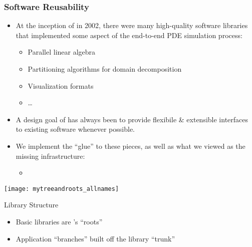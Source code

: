 \frame
{
  \frametitle{Software Reusability}
  \begin{itemize}
    \item At the inception of \libMesh{} in 2002, there were many high-quality software libraries that implemented some aspect of the end-to-end PDE simulation process:
      \begin{itemize}
        \item Parallel linear algebra
        \item Partitioning algorithms for domain decomposition
        \item Visualization formats
        \item \ldots
      \end{itemize}
    \item A design goal of \libMesh{} has always been to provide flexibile \& extensible interfaces to existing software whenever possible.
    \item We implement the ``glue'' to these pieces, as well as what we viewed as the missing infrastructure:
      \begin{itemize}
        \item {}
      \end{itemize}          
  \end{itemize}  
}



\begin{frame}[t]


    \begin{minipage}[h]{.6\textwidth}
    \begin{center}
      \texttt{[image: mytreeandroots\_allnames]}
    \end{center}
  \end{minipage}
  \begin{minipage}[h]{.35\textwidth}
    \begin{block}{Library Structure}
      \begin{itemize}
    \item Basic libraries are \LibMesh's ``roots''
    \item Application ``branches'' built off the library ``trunk''
      \end{itemize}
    \end{block}
  \end{minipage}
\end{frame}


